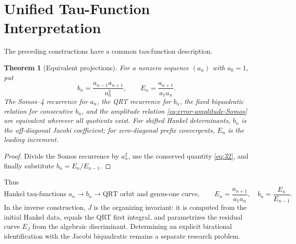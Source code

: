 \documentclass[11pt]{article}
\newtheorem{theorem}{Theorem}
\theoremstyle{remark}
\begin{document}
\section{Unified Tau-Function Interpretation}
The preceding constructions have a common tau-function description.
\begin{theorem}[Equivalent projections]
For a nonzero sequence $(a_n)$ with $a_0=1$, put
\[
b_n=\frac{a_{n-1}a_{n+1}}{a_n^2},\qquad E_n=\frac{a_{n+1}}{a_1a_n}.
\]
The Somos--4 recurrence for $a_n$, the QRT recurrence for $b_n$, the fixed
biquadratic relation for consecutive $b_n$, and the amplitude relation
\eqref{eq:error-amplitude-Somos} are equivalent wherever all quotients exist.
For shifted Hankel determinants, $b_n$ is the off-diagonal Jacobi coefficient;
for zero-diagonal prefix convergents, $E_n$ is the leading increment.
\end{theorem}
\begin{proof}
Divide the Somos recurrence by $a_n^2$, use the conserved quantity
\eqref{eq:32}, and finally substitute $b_n=E_n/E_{n-1}$.
\end{proof}
Thus
\[
\text{Hankel tau-functions }a_n\longrightarrow b_n\longrightarrow
\text{QRT orbit and genus-one curve},\qquad
E_n=\frac{a_{n+1}}{a_1a_n},\quad b_n=\frac{E_n}{E_{n-1}}.
\]
In the inverse construction, $J$ is the organizing invariant: it is computed
from the initial Hankel data, equals the QRT first integral, and parametrizes
the residual curve $E_J$ from the algebraic discriminant. Determining an
explicit birational identification with the Jacobi biquadratic remains a
separate research problem.
\end{document}
